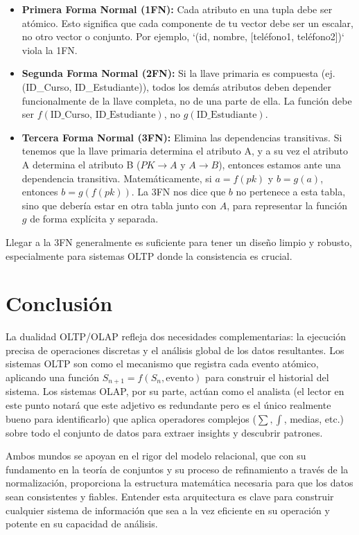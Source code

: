 \documentclass[12pt, letterpaper]{article}
\begin{document}
\begin{itemize}
    \item \textbf{Primera Forma Normal (1FN):} Cada atributo en una tupla debe ser atómico. Esto significa que cada componente de tu vector debe ser un escalar, no otro vector o conjunto. Por ejemplo, `(id, nombre, [teléfono1, teléfono2])` viola la 1FN.

    \item \textbf{Segunda Forma Normal (2FN):} Si la llave primaria es compuesta (ej. (ID\_Curso, ID\_Estudiante)), todos los demás atributos deben depender funcionalmente de la llave completa, no de una parte de ella. La función debe ser $f(\text{ID\_Curso, ID\_Estudiante})$, no $g(\text{ID\_Estudiante})$.

    \item \textbf{Tercera Forma Normal (3FN):} Elimina las dependencias transitivas. Si tenemos que la llave primaria determina el atributo A, y a su vez el atributo A determina el atributo B ($PK \rightarrow A$ y $A \rightarrow B$), entonces estamos ante una dependencia transitiva. Matemáticamente, si $a=f(pk)$ y $b=g(a)$, entonces $b=g(f(pk))$. La 3FN nos dice que $b$ no pertenece a esta tabla, sino que debería estar en otra tabla junto con $A$, para representar la función $g$ de forma explícita y separada.
\end{itemize}

Llegar a la 3FN generalmente es suficiente para tener un diseño limpio y robusto, especialmente para sistemas OLTP donde la consistencia es crucial.

\section*{Conclusión}

La dualidad OLTP/OLAP refleja dos necesidades complementarias: la ejecución precisa de operaciones discretas y el análisis global de los datos resultantes. Los sistemas OLTP son como el mecanismo que registra cada evento atómico, aplicando una función $S_{n+1} = f(S_n, \text{evento})$ para construir el historial del sistema. Los sistemas OLAP, por su parte, actúan como el analista (el lector en este punto notará que este adjetivo es redundante pero es el único realmente bueno para identificarlo) que aplica operadores complejos ($\sum, \int$, medias, etc.) sobre todo el conjunto de datos para extraer insights y descubrir patrones.

Ambos mundos se apoyan en el rigor del modelo relacional, que con su fundamento en la teoría de conjuntos y su proceso de refinamiento a través de la normalización, proporciona la estructura matemática necesaria para que los datos sean consistentes y fiables. Entender esta arquitectura es clave para construir cualquier sistema de información que sea a la vez eficiente en su operación y potente en su capacidad de análisis.
\end{document}
